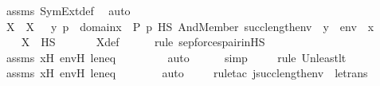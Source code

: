 \begin{isabellebody}
\ assms\ SymExt{\isacharunderscore}{\kern0pt}def\ \isamarkupfalse%
\ auto\ \isanewline
\isanewline
\ \ \isamarkupfalse%
\ X\ \ {\isachardoublequoteopen}X\ {\isasymequiv}\ {\isacharbraceleft}{\kern0pt}\ {\isacharless}{\kern0pt}y{\isacharcomma}{\kern0pt}\ p{\isachargreater}{\kern0pt}\ {\isasymin}\ domain{\isacharparenleft}{\kern0pt}x{\isacharprime}{\kern0pt}{\isacharparenright}{\kern0pt}\ {\isasymtimes}\ P{\isachardot}{\kern0pt}\ p\ {\isasymtturnstile}HS\ And{\isacharparenleft}{\kern0pt}Member{\isacharparenleft}{\kern0pt}{}{\isacharcomma}{\kern0pt}\ succ{\isacharparenleft}{\kern0pt}length{\isacharparenleft}{\kern0pt}env{\isacharprime}{\kern0pt}{\isacharparenright}{\kern0pt}{\isacharparenright}{\kern0pt}{\isacharparenright}{\kern0pt}{\isacharcomma}{\kern0pt}\ {\isasymphi}{\isacharparenright}{\kern0pt}\ {\isacharbrackleft}{\kern0pt}y{\isacharbrackright}{\kern0pt}\ {\isacharat}{\kern0pt}\ env{\isacharprime}{\kern0pt}\ {\isacharat}{\kern0pt}\ {\isacharbrackleft}{\kern0pt}x{\isacharprime}{\kern0pt}{\isacharbrackright}{\kern0pt}\ {\isacharbraceright}{\kern0pt}{\isachardoublequoteclose}\ \ \isanewline
\ \ \isamarkupfalse%
\ {\isachardoublequoteopen}X\ {\isasymin}\ HS{\isachardoublequoteclose}\ \isanewline
\ \ \ \ \isamarkupfalse%
\ X{\isacharunderscore}{\kern0pt}def\ \isanewline
\ \ \ \ \isamarkupfalse%
{\isacharparenleft}{\kern0pt}rule\ sep{\isacharunderscore}{\kern0pt}forces{\isacharunderscore}{\kern0pt}pair{\isacharunderscore}{\kern0pt}in{\isacharunderscore}{\kern0pt}HS{\isacharparenright}{\kern0pt}\isanewline
\ \ \ \ \isamarkupfalse%
\ assms\ x{\isacharprime}{\kern0pt}H\ env{\isacharprime}{\kern0pt}H\ leneq\isanewline
\ \ \ \ \ \ \ \isamarkupfalse%
\ auto{\isacharbrackleft}{\kern0pt}{}{\isacharbrackright}{\kern0pt}\isanewline
\ \ \ \ \isamarkupfalse%
\ simp\isanewline
\ \ \ \ \isamarkupfalse%
{\isacharparenleft}{\kern0pt}rule\ Un{\isacharunderscore}{\kern0pt}least{\isacharunderscore}{\kern0pt}lt{\isacharparenright}{\kern0pt}{\isacharplus}{\kern0pt}\isanewline
\ \ \ \ \isamarkupfalse%
\ assms\ x{\isacharprime}{\kern0pt}H\ env{\isacharprime}{\kern0pt}H\ leneq\isanewline
\ \ \ \ \ \ \isamarkupfalse%
\ auto{\isacharbrackleft}{\kern0pt}{}{\isacharbrackright}{\kern0pt}\isanewline
\ \ \ \ \isamarkupfalse%
{\isacharparenleft}{\kern0pt}rule{\isacharunderscore}{\kern0pt}tac\ j{\isacharequal}{\kern0pt}{\isachardoublequoteopen}succ{\isacharparenleft}{\kern0pt}length{\isacharparenleft}{\kern0pt}env{\isacharparenright}{\kern0pt}{\isacharparenright}{\kern0pt}{\isachardoublequoteclose}\ \ le{\isacharunderscore}{\kern0pt}trans{\isacharparenright}{\kern0pt}\isanewline

\end{isabellebody}
